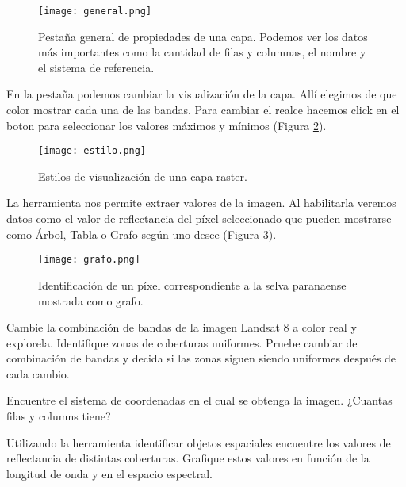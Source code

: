 \begin{figure}[h!]
\begin{center}
    \texttt{[image: general.png]}
\end{center}
\caption{Pestaña general de propiedades de una capa. Podemos ver
    los datos m\'as importantes como la cantidad de filas y
    columnas, el nombre y el sistema de referencia.}
\label{fig:general}
\end{figure}

En la pestaña  podemos cambiar la visualizaci\'on de
la capa. All\'i elegimos de que color mostrar cada una de las
bandas. Para cambiar el realce hacemos
click en el boton  para seleccionar los valores m\'aximos y m\'inimos
(Figura \ref{fig:estilo}).

\begin{figure}[h!]
\begin{center}
    \texttt{[image: estilo.png]}
\end{center}
\caption{Estilos de visualizaci\'on de una capa raster.}
\label{fig:estilo}
\end{figure}

La herramienta  nos permite extraer valores
de la imagen. Al habilitarla veremos datos como el valor
de reflectancia del p\'ixel seleccionado que pueden mostrarse como
\'Arbol, Tabla o Grafo seg\'un uno desee (Figura \ref{fig:grafo}).

\begin{figure}[h!]
\begin{center}
    \texttt{[image: grafo.png]}
\end{center}
\caption{Identificaci\'on de un p\'ixel correspondiente a la selva paranaense
    mostrada como grafo. }
\label{fig:grafo}
\end{figure}

\begin{act}
    Cambie la combinación de bandas de la imagen Landsat 8 a color real y explorela.
    Identifique zonas de coberturas uniformes. Pruebe cambiar de
    combinaci\'on de bandas y decida si las zonas siguen siendo uniformes
    despu\'es de cada cambio.
\end{act}

\begin{act}
    Encuentre el sistema de coordenadas en el cual se obtenga la imagen.
    ¿Cuantas filas y columns tiene?
\end{act}

\begin{act}
   Utilizando la herramienta identificar objetos espaciales encuentre los
   valores de reflectancia de distintas coberturas. Grafique estos  valores en
   funci\'on de la longitud de onda y en el espacio espectral.
\end{act}

